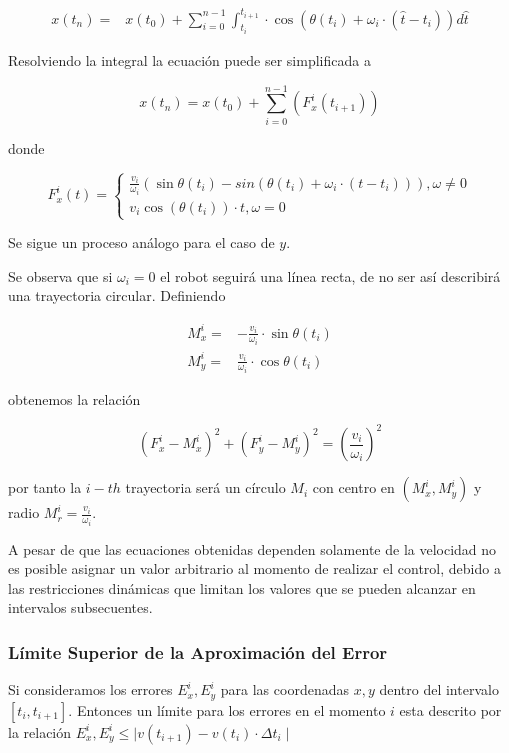 \documentclass[10pt]{article}
\begin{document}
\begin{equation}
\begin{aligned}
	x(t_n) = &
		x(t_0) + \sum_{i=0}^{n-1} \int_{t_i}^{t_{i+1}} \cdot
		\cos \left( \theta(t_i) + \omega_i \cdot(\hat{t} - t_i) \right) d\hat{t}
\end{aligned}
\end{equation}

Resolviendo la integral la ecuación puede ser simplificada a

\begin{equation}
	x(t_n) = x(t_0) + \sum_{i=0}^{n-1} (F_x^i(t_{i+1}))
\end{equation}

donde

\begin{equation}
	F_x^i(t) = 
	\begin{cases}
		\frac{v_i}{\omega_i} (
			\sin \theta(t_i) - sin( \theta(t_i) +  \omega_i \cdot ( 				t - t_i))
		), \omega \neq 0 \\
		v_i \cos( \theta(t_i)) \cdot t, \omega = 0
	\end{cases}
\end{equation}

Se sigue un proceso análogo para el caso de $y$.

Se observa que si $\omega_i = 0$ el robot seguirá una línea recta, de no ser así describirá una trayectoria circular. Definiendo

\begin{align}
	M_x^i = 
		&- \frac{v_i}{\omega_i} \cdot \sin\theta(t_i)
	\\ 
	M_y^i = &\frac{v_i}{\omega_i} \cdot \cos\theta(t_i)
\end{align}

obtenemos la relación

\begin{equation}
	(F_x^i - M_x^i)^2 + (F_y^i - M_y^i)^2 = \left(\frac{v_i}{\omega_i}\right)^2
\end{equation}

por tanto la $i-th$ trayectoria será un círculo $M_i$ con centro en $(M_x^i, M_y^i)$ y radio $M_r^i = \frac{v_i}{\omega_i}$.

A pesar de que las ecuaciones obtenidas dependen solamente de la velocidad no es posible asignar un valor arbitrario al momento de realizar el control, debido a las restricciones dinámicas que limitan los valores que se pueden alcanzar en intervalos subsecuentes.

\subsubsection*{Límite Superior de la Aproximación del Error}
Si consideramos los errores $E_x^i, E_y^i$ para las coordenadas $x, y$ dentro del intervalo $[t_i, t_{i+1}]$. Entonces un límite para los errores en el momento $i$ esta descrito por la relación $E_x^i, E_y^i\leq \mid v(t_{i+1}) - v(t_i) \cdot \Delta t_i \mid$
\end{document}
